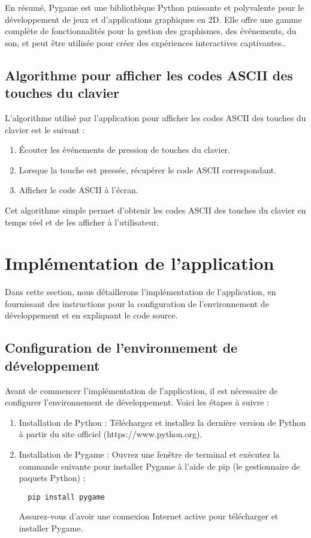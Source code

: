 \documentclass[12pt,a4paper]{report}
\begin{document}
En résumé, Pygame est une bibliothèque Python puissante et polyvalente pour le développement de jeux et d'applications graphiques en 2D. Elle offre une gamme complète de fonctionnalités pour la gestion des graphismes, des événements, du son, et peut être utilisée pour créer des expériences interactives captivantes..



\subsection{Algorithme pour afficher les codes ASCII des touches du clavier}

L'algorithme utilisé par l'application pour afficher les codes ASCII des touches du clavier est le suivant :

\begin{enumerate}
  \item Écouter les événements de pression de touches du clavier.
  \item Lorsque la touche est pressée, récupérer le code ASCII correspondant.
  \item Afficher le code ASCII à l'écran.
\end{enumerate}

Cet algorithme simple permet d'obtenir les codes ASCII des touches du clavier en temps réel et de les afficher à l'utilisateur.
\newpage

\section{Implémentation de l'application}

Dans cette section, nous détaillerons l'implémentation de l'application, en fournissant des instructions pour la configuration de l'environnement de développement et en expliquant le code source.

\subsection{Configuration de l'environnement de développement}

Avant de commencer l'implémentation de l'application, il est nécessaire de configurer l'environnement de développement. Voici les étapes à suivre :

\begin{enumerate}
  \item Installation de Python : Téléchargez et installez la dernière version de Python à partir du site officiel (https://www.python.org).
  \item Installation de Pygame : Ouvrez une fenêtre de terminal et exécutez la commande suivante pour installer Pygame à l'aide de pip (le gestionnaire de paquets Python) :
  
  \begin{verbatim}
  pip install pygame
  \end{verbatim}
  
  Assurez-vous d'avoir une connexion Internet active pour télécharger et installer Pygame.
\end{enumerate}
\end{document}
